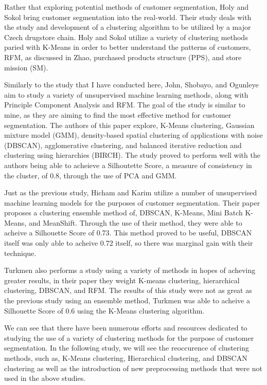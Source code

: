\documentclass[twocolumn]{article}
\begin{document}
Rather that exploring potential methods of customer segmentation, Holy and Sokol bring customer segmentation into the real-world. Their study deals with the study and development of a clustering algorithm to be utilized by a major Czech drugstore chain.\cite{sokol} Holy and Sokol utilize a variety of clustering methods paried with K-Means in order to better understand the patterns of customers, RFM, as discussed in Zhao,\cite{zhao} purchased products structure (PPS), and store mission (SM).

Similarly to the study that I have conducted here, John, Shobayo, and Ogunleye aim to study a variety of unsupervised machine learning methods, along with Principle Component Analysis and RFM.\cite{john} The goal of the study is similar to mine, as they are aiming to find the most effective method for customer segmentation. The authors of this paper explore, K-Means clustering, Gaussian mixture model (GMM), density-based spatial clustering of applications with noise (DBSCAN), agglomerative clustering, and balanced iterative reduction and clustering using hierarchies (BIRCH).\cite{john} The study proved to perform well with the authors being able to acheieve a Silhoutette Score, a measure of consistency in the cluster, of 0.8, through the use of PCA and GMM.\cite{john}

Just as the previous study, Hicham and Karim utilize a number of unsupervised machine learning models for the purposes of customer segmentation. Their paper proposes a clustering ensemble method of, DBSCAN, K-Means, Mini Batch K-Means, and MeanShift. Through the use of their method, they were able to acheive a Silhouette Score of 0.73.\cite{hicham} This method proved to be useful, DBSCAN itself was only able to acheive 0.72 itself, so there was marginal gain with their technique.\cite{hicham}

Turkmen also performs a study using a variety of methods in hopes of acheving greater results, in their paper they weight K-means clustering, hierarchical clustering, DBSCAN, and RFM.\cite{turkmen} The results of this study were not as great as the previous study using an ensemble method, Turkmen was able to acheive a Silhouette Score of 0.6 using the K-Means clustering algorithm.\cite{turkmen} 

We can see that there have been numerous efforts and resources dedicated to studying the use of a variety of clustering methods for the purpose of customer segmentation. In the following study, we will see the reoccurence of clustering methods, such as, K-Means clustering, Hierarchical clustering, and DBSCAN clustering as well as the introduction of new preprocessing methods that were not used in the above studies.
\end{document}
